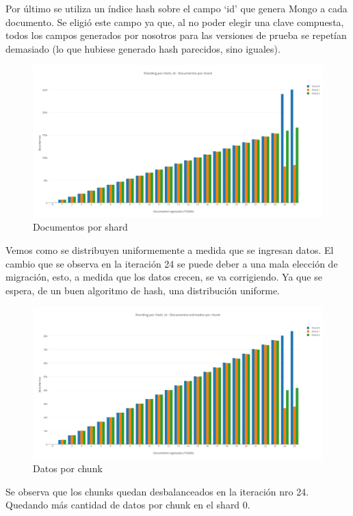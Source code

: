 Por último se utiliza un índice hash sobre el campo `id' que genera Mongo a cada documento. Se eligió este campo ya que, al no poder elegir una clave compuesta, todos los campos generados por nosotros para las versiones de prueba se repetían demasiado (lo que hubiese generado hash parecidos, sino iguales).

\begin{figure}[h!]
 \centering
 \includegraphics[scale=0.3]{./hash-documentos-por-shard.png}
 \caption{Documentos por shard}
\end{figure}

Vemos como se distribuyen uniformemente a medida que se ingresan datos. El cambio que se observa en la iteración 24 se puede deber a una mala elección de migración, esto, a medida que los datos crecen, se va corrigiendo. Ya que se espera, de un buen algoritmo de hash, una distribución uniforme.

\begin{figure}[h!]
 \centering
 \includegraphics[scale=0.3]{./hash-documentos-estimados-por-chunk.png}
 \caption{Datos por chunk}
\end{figure}

Se observa que los chunks quedan desbalanceados en la iteración nro 24.
Quedando más cantidad de datos por chunk en el shard 0.\\


